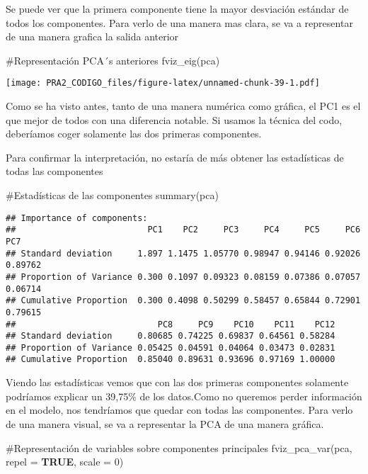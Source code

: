 \documentclass[
]{article}
\newenvironment{Shaded}{\begin{snugshade}}{\end{snugshade}}
\newcommand{\AttributeTok}[1]{\textcolor[rgb]{0.80,0.80,0.80}{#1}}
\newcommand{\CommentTok}[1]{\textcolor[rgb]{0.50,0.62,0.50}{#1}}
\newcommand{\ConstantTok}[1]{\textcolor[rgb]{0.86,0.64,0.64}{\textbf{#1}}}
\newcommand{\DecValTok}[1]{\textcolor[rgb]{0.86,0.86,0.80}{#1}}
\newcommand{\FunctionTok}[1]{\textcolor[rgb]{0.94,0.94,0.56}{#1}}
\newcommand{\NormalTok}[1]{\textcolor[rgb]{0.80,0.80,0.80}{#1}}
\begin{document}
Se puede ver que la primera componente tiene la mayor desviación
estándar de todos los componentes. Para verlo de una manera mas clara,
se va a representar de una manera grafica la salida anterior

\begin{Shaded}
\begin{Highlighting}[]
\CommentTok{\#Representación PCA´s anteriores}
\FunctionTok{fviz\_eig}\NormalTok{(pca)}
\end{Highlighting}
\end{Shaded}

\texttt{[image: PRA2\_CODIGO\_files/figure-latex/unnamed-chunk-39-1.pdf]}

Como se ha visto antes, tanto de una manera numérica como gráfica, el
PC1 es el que mejor de todos con una diferencia notable. Si usamos la
técnica del codo, deberíamos coger solamente las dos primeras
componentes.

Para confirmar la interpretación, no estaría de más obtener las
estadísticas de todas las componentes

\begin{Shaded}
\begin{Highlighting}[]
\CommentTok{\#Estadísticas de las componentes}
\FunctionTok{summary}\NormalTok{(pca)}
\end{Highlighting}
\end{Shaded}

\begin{verbatim}
## Importance of components:
##                          PC1    PC2     PC3     PC4     PC5     PC6     PC7
## Standard deviation     1.897 1.1475 1.05770 0.98947 0.94146 0.92026 0.89762
## Proportion of Variance 0.300 0.1097 0.09323 0.08159 0.07386 0.07057 0.06714
## Cumulative Proportion  0.300 0.4098 0.50299 0.58457 0.65844 0.72901 0.79615
##                            PC8     PC9    PC10    PC11    PC12
## Standard deviation     0.80685 0.74225 0.69837 0.64561 0.58284
## Proportion of Variance 0.05425 0.04591 0.04064 0.03473 0.02831
## Cumulative Proportion  0.85040 0.89631 0.93696 0.97169 1.00000
\end{verbatim}

Viendo las estadísticas vemos que con las dos primeras componentes
solamente podríamos explicar un 39,75\% de los datos.Como no queremos
perder información en el modelo, nos tendríamos que quedar con todas las
componentes. Para verlo de una manera visual, se va a representar la PCA
de una manera gráfica.

\begin{Shaded}
\begin{Highlighting}[]
\CommentTok{\#Representación de variables sobre componentes principales}
\FunctionTok{fviz\_pca\_var}\NormalTok{(pca, }\AttributeTok{repel =} \ConstantTok{TRUE}\NormalTok{, }\AttributeTok{scale =} \DecValTok{0}\NormalTok{)}
\end{Highlighting}
\end{Shaded}
\end{document}
